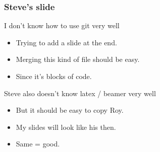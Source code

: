 
\begin{frame}
\frametitle{Steve's slide}
\begin{center}

\begin{block}{I don't know how to use git very well}
\begin{itemize}
	\item Trying to add a slide at the end.
	\item Merging this kind of file should be easy.
	\item Since it's blocks of code.
\end{itemize}
\end{block}

\begin{exampleblock}{Steve also doesn't know latex / beamer very well}
\begin{itemize}
	\item But it should be easy to copy Roy.
	\item My slides will look like his then.
	\item Same = good.
\end{itemize}
\end{exampleblock}

\end{center}
\end{frame}


